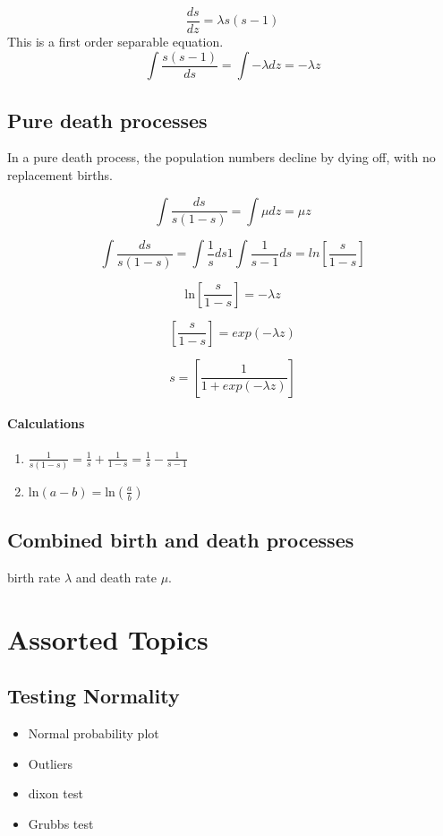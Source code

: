 \[
\frac{ds}{dz} = \lambda s(s-1)
\]
This is a first order separable equation.
\[
\int \frac{s(s-1)}{ds} = \int -\lambda dz = -\lambda z
\]


\section{Pure death processes}
In a pure death process, the population numbers decline by dying
off, with no replacement births.

\[ \int \frac{ds}{s(1-s)} = \int \mu dz = \mu z \]


\[ \int \frac{ds}{s(1-s)} = \int \frac{1}{s} ds 1 \int
\frac{1}{s-1}ds= ln \left[\frac{s}{1-s} \right]
\]

\[  \mbox{ln} \left[\frac{s}{1-s} \right] = -\lambda z
\]

\[  \left[\frac{s}{1-s} \right] = exp(-\lambda z)
\]

\[  s = \left[\frac{1}{1+exp(-\lambda z)} \right]
\]

\subsubsection{Calculations}
\begin{enumerate} \item  $ \frac{1}{s(1-s)} = \frac{1}{s} + \frac{1}{1-s} =
	\frac{1}{s} - \frac{1}{s-1}$
	\item $ \mbox{ln}(a-b) = \mbox{ln}(\frac{a}{b})$\\
\end{enumerate}

\section{Combined birth and death processes}
birth rate $\lambda$ and death rate $\mu$.


\newpage
\chapter{Assorted Topics}

\section{Testing Normality}

\begin{itemize}
	\item Normal probability plot \item Outliers \item dixon test
	\item Grubbs test
\end{itemize}


